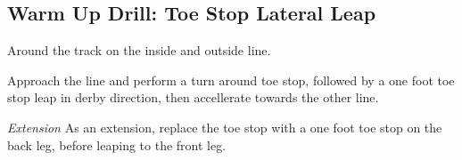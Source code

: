\subsection*{Warm Up Drill: Toe Stop Lateral Leap}
\label{drill:toe_stops/warm_up/leap}

Around the track on the inside and outside line.

Approach the line and perform a turn around toe stop, followed by a one foot toe stop leap in derby direction, then accellerate towards the other line.

{\it Extension}
As an extension, replace the toe stop with a one foot toe stop on the back leg, before leaping to the front leg.
